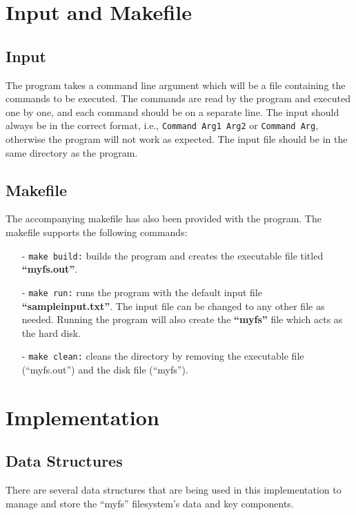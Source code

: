 \documentclass{article}
\theoremstyle{mytheoremstyle}
\theoremstyle{mytheoremstyle}
\theoremstyle{myproblemstyle}
\begin{document}
\newpage
\section{Input and Makefile}
\subsection{Input}
The program takes a command line argument which will be a file containing the commands to be executed. The commands are read by the program and executed one by one, and each command should be on a separate line. The input should always be in the correct format, i.e., \texttt{Command Arg1 Arg2} or \texttt{Command Arg}, otherwise the program will not work as expected. The input file should be in the same directory as the program. 

\subsection{Makefile}
The accompanying makefile has also been provided with the program. The makefile supports the following commands: \vspace*{-2mm}
\begin{itemize}
    \item[-] \texttt{make build:} builds the program and creates the executable file titled \textbf{``myfs.out''}.
    \item[-] \texttt{make run:} runs the program with the default input file \textbf{``sampleinput.txt''}. The input file can be changed to any other file as needed. Running the program will also create the \textbf{``myfs''} file which acts as the hard disk.
    \item[-] \texttt{make clean:} cleans the directory by removing the executable file (``myfs.out'') and the disk file (``myfs'').  
\end{itemize}

\newpage
\section{Implementation}
\subsection{Data Structures}
There are several data structures that are being used in this implementation to manage and store the ``myfs'' filesystem's data and key components.
\end{document}
